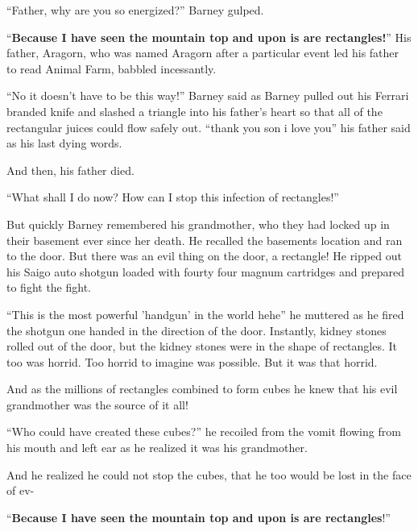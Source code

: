 ``Father, why are you so energized?'' Barney gulped.

``{\bf Because I have seen the mountain top and upon is are
  rectangles!}''  His father, Aragorn, who was named Aragorn after a
particular event led his father to read Animal Farm, babbled
incessantly.

``No it doesn't have to be this way!'' Barney said as Barney pulled
out his Ferrari branded knife and slashed a triangle into his
father's heart so that all of the rectangular juices could flow
safely out. ``thank you son i love you'' his father said as his last
dying words.

And then, his father died.

``What shall I do now? How can I stop this infection of
rectangles!''

But quickly Barney remembered his grandmother, who they had locked
up in their basement ever since her death. He recalled the
basements location and ran to the door. But there was an evil thing
on the door, a rectangle! He ripped out his Saigo auto shotgun
loaded with fourty four magnum cartridges and prepared to fight the
fight.

``This is the most powerful 'handgun' in the world hehe'' he muttered
as he fired the shotgun one handed in the direction of the door.
Instantly, kidney stones rolled out of the door, but the kidney
stones were in the shape of rectangles. It too was horrid. Too
horrid to imagine was possible. But it was that horrid.

And as the millions of rectangles combined to form cubes he knew
that his evil grandmother was the source of it all!

``Who could have created these cubes?'' he recoiled from the vomit
flowing from his mouth and left ear as he realized it was his
grandmother.

And he realized he could not stop the cubes, that he too would be
lost in the face of ev-

``{\bf Because I have seen the mountain top and upon is are
rectangles}!''
 



